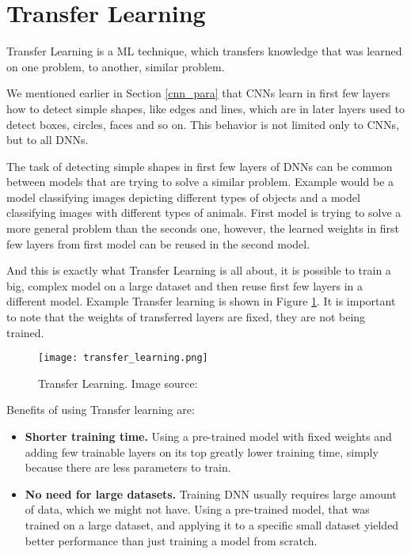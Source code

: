 \section{ Transfer Learning}\label{transfer_para}

Transfer Learning is a ML technique, which transfers knowledge that was learned on one problem, to another, similar problem.

We mentioned earlier in Section \ref{cnn_para} that CNNs learn in first few layers how to detect simple shapes, like edges and lines, which are in later layers used to detect boxes, circles, faces and so on. 
This behavior is not limited only to CNNs, but to all DNNs.

The task of detecting simple shapes in first few layers of DNNs can be common between models that are trying to solve a similar problem.
Example would be a model classifying images depicting different types of objects and a model classifying images with different types of animals.
First model is trying to solve a more general problem than the seconds one, however, the learned weights in first few layers from first model can be reused in the second model.

And this is exactly what Transfer Learning is all about, it is possible to train a big, complex model on a large dataset and then reuse first few layers in a different model.
Example Transfer learning is shown in Figure \ref{transfer_learning}.
It is important to note that the weights of transferred layers are fixed, they are not being trained.

\begin{figure}[ht] 
    \centering
    \texttt{[image: transfer\_learning.png]} 
    \caption[Transfer Learning.] {Transfer Learning. Image source: \cite{geron}}
    \label{transfer_learning}
\end{figure}

Benefits of using Transfer learning are:

\begin{itemize}
    \item \textbf{Shorter training time.} Using a pre-trained model with fixed weights and adding few trainable layers on its top greatly lower training time, simply because there are less parameters to train.
    \item \textbf{No need for large datasets.} Training DNN usually requires large amount of data, which we might not have. Using a pre-trained model, that was trained on a large dataset, and applying it to a specific small dataset yielded better performance than just training a model from scratch\cite{geron}.
\end{itemize}


